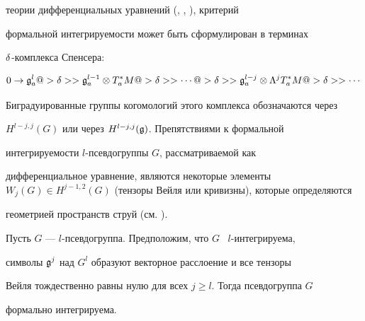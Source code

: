 теории дифференциальных уравнений (\cite{Go}, \cite{Gu}, \cite{S}), критерий


формальной интегрируемости может быть сформулирован в терминах


$\delta$-комплекса Спенсера:


$$




0 \to\g^l_a@> \d>>\g^{l-1}_a\ot T^*_aM@>\d>>


\dotsb@>\d>>\g^{l-j}_a\ot\La^jT^*_aM @>\d>> \dotsb


$$


Биградуированные группы когомологий этого комплекса обозначаются через


$H^{l-j,j}(G)$ или через $H^{l-j,j}({\frak g})$. Препятствиями к формальной


интегрируемости $l$-псевдогруппы $G$, рассматриваемой как


дифференциальное уравнение, являются некоторые элементы $W_j(G)\in


H^{j-1,2}(G)$ (тензоры Вейля или кривизны), которые определяются


геометрией пространств струй (см. \cite{Ly}).








\begin{thm}


Пусть $G$ --- $l$-псевдогруппа. Предположим, что $G$ \ $l$-интегрируема,


символы ${\frak g}^j$ над $G^l$ образуют векторное расслоение и все тензоры


Вейля тождественно равны нулю для всех $j\ge l$. Тогда псевдогруппа $G$


формально интегрируема.


\end{thm}





